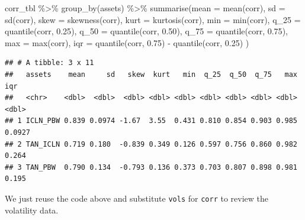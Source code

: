 \documentclass{article}
\newenvironment{Shaded}{\begin{snugshade}}{\end{snugshade}}
\newcommand{\AttributeTok}[1]{\textcolor[rgb]{0.77,0.63,0.00}{#1}}
\newcommand{\FloatTok}[1]{\textcolor[rgb]{0.00,0.00,0.81}{#1}}
\newcommand{\FunctionTok}[1]{\textcolor[rgb]{0.00,0.00,0.00}{#1}}
\newcommand{\NormalTok}[1]{#1}
\newcommand{\SpecialCharTok}[1]{\textcolor[rgb]{0.00,0.00,0.00}{#1}}
\begin{document}
\begin{Shaded}
\begin{Highlighting}[]
\NormalTok{corr\_tbl }\SpecialCharTok{\%\textgreater{}\%} \FunctionTok{group\_by}\NormalTok{(assets) }\SpecialCharTok{\%\textgreater{}\%} 
  \FunctionTok{summarise}\NormalTok{(}\AttributeTok{mean =} \FunctionTok{mean}\NormalTok{(corr), }
            \AttributeTok{sd =} \FunctionTok{sd}\NormalTok{(corr), }\AttributeTok{skew =} \FunctionTok{skewness}\NormalTok{(corr), }
            \AttributeTok{kurt =} \FunctionTok{kurtosis}\NormalTok{(corr), }
            \AttributeTok{min =} \FunctionTok{min}\NormalTok{(corr), }
            \AttributeTok{q\_25 =} \FunctionTok{quantile}\NormalTok{(corr, }\FloatTok{0.25}\NormalTok{), }
            \AttributeTok{q\_50 =} \FunctionTok{quantile}\NormalTok{(corr, }\FloatTok{0.50}\NormalTok{), }
            \AttributeTok{q\_75 =} \FunctionTok{quantile}\NormalTok{(corr, }\FloatTok{0.75}\NormalTok{), }
            \AttributeTok{max =} \FunctionTok{max}\NormalTok{(corr),}
            \AttributeTok{iqr =} \FunctionTok{quantile}\NormalTok{(corr, }\FloatTok{0.75}\NormalTok{) }\SpecialCharTok{{-}} \FunctionTok{quantile}\NormalTok{(corr, }\FloatTok{0.25}\NormalTok{)}
\NormalTok{            )}
\end{Highlighting}
\end{Shaded}

\begin{verbatim}
## # A tibble: 3 x 11
##   assets    mean     sd   skew  kurt   min  q_25  q_50  q_75   max    iqr
##   <chr>    <dbl>  <dbl>  <dbl> <dbl> <dbl> <dbl> <dbl> <dbl> <dbl>  <dbl>
## 1 ICLN_PBW 0.839 0.0974 -1.67  3.55  0.431 0.810 0.854 0.903 0.985 0.0927
## 2 TAN_ICLN 0.719 0.180  -0.839 0.349 0.126 0.597 0.756 0.860 0.982 0.264 
## 3 TAN_PBW  0.790 0.134  -0.793 0.136 0.373 0.703 0.807 0.898 0.981 0.195
\end{verbatim}

We just reuse the code above and substitute \texttt{vols} for
\texttt{corr} to review the volatility data.
\end{document}
